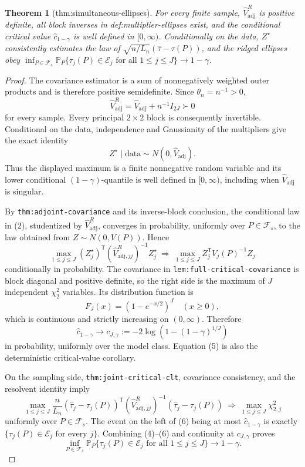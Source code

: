 \documentclass{article}
\newtheorem{theorem}{Theorem}
\begin{document}
\begin{theorem}[thm:simultaneous-ellipses]\label{thm:simultaneous-ellipses}
For every finite sample, \(\widehat V_{\mathrm{adj}}^{R}\) is positive definite, all block inverses in def:multiplier-ellipses exist, and the conditional critical value \(\widehat c_{1-\gamma}\) is well defined in \([0,\infty)\). Conditionally on the data, \(Z^\star\) consistently estimates the law of \(\sqrt{n/L_n}(\widehat\tau-\tau(P))\), and the ridged ellipses obey \(\inf_{P\in\mathcal F_s}\mathbb P_P\{\tau_j(P)\in\mathcal E_j\text{ for all }1\leq j\leq J\}\to1-\gamma\).
\end{theorem}
\begin{proof}
The covariance estimator is a sum of nonnegatively weighted outer products and is therefore positive semidefinite.  Since \(\theta_n=n^{-1}>0\),
\[
 \widehat V_{\mathrm{adj}}^R
 =\widehat V_{\mathrm{adj}}+n^{-1}I_{2J}\succ0                         \tag{1}
\]
for every sample.  Every principal \(2\times2\) block is consequently invertible.  Conditional on the data, independence and Gaussianity of the multipliers give the exact identity
\[
 Z^\star\mid\text{data}\sim N(0,\widehat V_{\mathrm{adj}}).          \tag{2}
\]
Thus the displayed maximum is a finite nonnegative random variable and its lower conditional \((1-\gamma)\)-quantile is well defined in \([0,\infty)\), including when \(\widehat V_{\mathrm{adj}}\) is singular.

By \texttt{thm:adjoint-covariance} and its inverse-block conclusion, the conditional law in (2), studentized by \(\widehat V_{\mathrm{adj}}^R\), converges in probability, uniformly over \(P\in\mathcal F_s\), to the law obtained from \(Z\sim N(0,V(P))\).  Hence
\[
 \max_{1\leq j\leq J}(Z_j^\star)^{\mathsf T}
 (\widehat V_{\mathrm{adj},jj}^R)^{-1}Z_j^\star
 \ \Longrightarrow\ 
 \max_{1\leq j\leq J}Z_j^{\mathsf T}V_j(P)^{-1}Z_j                 \tag{3}
\]
conditionally in probability.  The covariance in \texttt{lem:full-critical-covariance} is block diagonal and positive definite, so the right side is the maximum of \(J\) independent \(\chi^2_2\) variables.  Its distribution function is
\[
 F_J(x)=(1-e^{-x/2})^J\quad(x\geq0),                                  \tag{4}
\]
which is continuous and strictly increasing on \((0,\infty)\).  Therefore
\[
 \widehat c_{1-\gamma}\longrightarrow
 c_{J,\gamma}:=-2\log\!\left(1-(1-\gamma)^{1/J}\right)              \tag{5}
\]
in probability, uniformly over the model class.  Equation (5) is also the deterministic critical-value corollary.

On the sampling side, \texttt{thm:joint-critical-clt}, covariance consistency, and the resolvent identity imply
\[
 \max_{1\leq j\leq J}\frac n{L_n}
 (\widehat\tau_j-\tau_j(P))^{\mathsf T}
 (\widehat V_{\mathrm{adj},jj}^R)^{-1}
 (\widehat\tau_j-\tau_j(P))
 \ \Longrightarrow\ \max_{1\leq j\leq J}\chi^2_{2,j}             \tag{6}
\]
uniformly over \(P\in\mathcal F_s\).  The event on the left of (6) being at most \(\widehat c_{1-\gamma}\) is exactly
\(\{\tau_j(P)\in\mathcal E_j\text{ for every }j\}\).  Combining (4)--(6) and continuity at \(c_{J,\gamma}\) proves
\[
 \inf_{P\in\mathcal F_s}\mathbb P_P
 \{\tau_j(P)\in\mathcal E_j\text{ for all }1\leq j\leq J\}
 \longrightarrow1-\gamma.                                            \tag{7}
\]
\end{proof}
\end{document}
